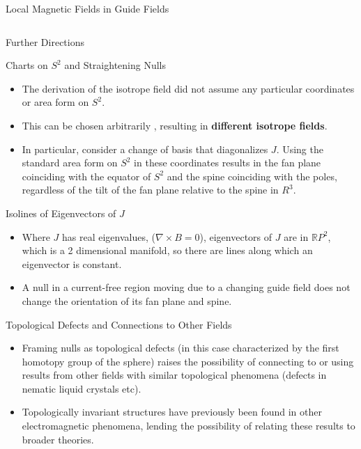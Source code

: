 \documentclass[final]{beamer}
\newlength{\onecolwid}
\newlength{\twocolwid}
\begin{document}
\begin{frame}[t]
\begin{columns}[t]
\begin{column}{\twocolwid}
\begin{block}{\huge{Local Magnetic Fields in Guide Fields}}
\begin{columns}[t,totalwidth=\twocolwid]
\begin{column}{\onecolwid}
\begin{block}{\huge Further Directions}
  \begin{block}{Charts on $S^2$ and Straightening Nulls}
    \begin{itemize}
      \item The derivation of the isotrope field did not assume
        any particular coordinates or area form on $S^2$.
      \item This can be chosen arbitrarily , resulting in \textbf{different isotrope fields}.
      \item In particular, consider a change of basis that diagonalizes $J$.
        Using the standard area form on $S^2$ in these coordinates results in the fan plane
        coinciding with the equator of $S^2$ and the spine coinciding with the poles,
        regardless of the tilt of the fan plane relative to the spine in $R^3$.
    \end{itemize}
  \end{block}

  \begin{block}{Isolines of Eigenvectors of $J$}
    \begin{itemize}
      \item Where $J$ has real eigenvalues, ($\nabla \times B=0$),
        eigenvectors of $J$ are in $\mathbb{R}P^2$, which is a 2 dimensional manifold,
        so there are lines along which an eigenvector is constant.
      \item A null in a current-free region
        moving due to a changing guide field does not change the orientation of
        its fan plane and spine.
    \end{itemize}
  \end{block}

  \begin{block}{Topological Defects and Connections to Other Fields}
    \begin{itemize}
      \item Framing nulls as topological defects
        (in this case characterized by the first homotopy group of the sphere)
        raises the possibility of connecting to or using results from
        other fields with similar topological phenomena
        (defects in nematic liquid crystals\cite{alexander2012nematic} etc).
      \item Topologically invariant structures have previously been
        found in other electromagnetic phenomena, lending the possibility
        of relating these results to broader theories.\cite{thompson2014hopfions,ranada1992em}
    \end{itemize}
  \end{block}  
  

\end{block}
\end{column}
\end{columns}
\end{block}
\end{column}
\end{columns}
\end{frame}
\end{document}
